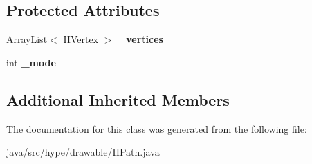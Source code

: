 \subsection*{Protected Attributes}
\begin{DoxyCompactItemize}
\item 
\hypertarget{classhype_1_1drawable_1_1_h_path_a61f9c092fff56509a72121fb4e707611}{Array\-List$<$ \hyperlink{classhype_1_1drawable_1_1_h_path_1_1_h_vertex}{H\-Vertex} $>$ {\bfseries \-\_\-vertices}}\label{classhype_1_1drawable_1_1_h_path_a61f9c092fff56509a72121fb4e707611}

\item 
\hypertarget{classhype_1_1drawable_1_1_h_path_ac3f65fdd8abc15cf5a2d9f007282b33a}{int {\bfseries \-\_\-mode}}\label{classhype_1_1drawable_1_1_h_path_ac3f65fdd8abc15cf5a2d9f007282b33a}

\end{DoxyCompactItemize}
\subsection*{Additional Inherited Members}


The documentation for this class was generated from the following file\-:\begin{DoxyCompactItemize}
\item 
java/src/hype/drawable/H\-Path.\-java\end{DoxyCompactItemize}
